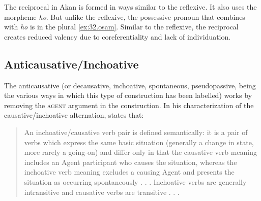 \documentclass[output=paper]{langsci/langscibook}
\begin{document}
The reciprocal in Akan is formed in ways similar to the reflexive. It also uses the morpheme \textit{ho}. But unlike the reflexive, the possessive pronoun that combines with \textit{ho} is in the plural \ref{ex:32.osam}. Similar to the reflexive, the reciprocal creates reduced valency due to coreferentiality and lack of individuation.

\ea
\label{ex:32.osam}
	\z

	\z
\z

\subsection{Anticausative/Inchoative}\label{§4.3:anticausative.osam}

The anticausative (or decausative, inchoative, spontaneous, pseudopassive, being the various ways in which this type of construction has been labelled) works by removing the \textsc{agent} argument in the construction. In his characterization of the causative/inchoative alternation, \citeauthor{haspelmath1993} states that:

\begin{quote}
An inchoative/causative verb pair is defined semantically: it is a pair of verbs which express the same basic situation (generally a change in state, more rarely a going-on) and differ only in that the causative verb meaning includes an Agent participant who causes the situation, whereas the inchoative verb meaning excludes a causing Agent and presents the situation as occurring spontaneously . . . Inchoative verbs are generally intransitive and causative verbs are transitive . . . \citep[90]{haspelmath1993}
\end{quote}
\end{document}
